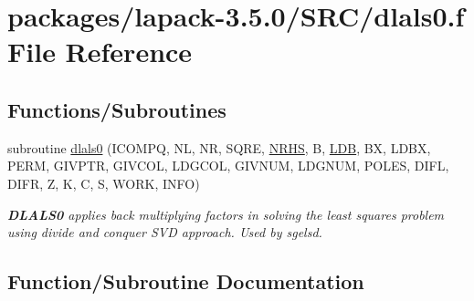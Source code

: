 \hypertarget{dlals0_8f}{}\section{packages/lapack-\/3.5.0/\+S\+R\+C/dlals0.f File Reference}
\label{dlals0_8f}
\subsection*{Functions/\+Subroutines}
\begin{DoxyCompactItemize}
\item 
subroutine \hyperlink{dlals0_8f_a09dd12ecac3ff2bc46fed24422500ab2}{dlals0} (I\+C\+O\+M\+P\+Q, N\+L, N\+R, S\+Q\+R\+E, \hyperlink{example__user_8c_aa0138da002ce2a90360df2f521eb3198}{N\+R\+H\+S}, B, \hyperlink{example__user_8c_a50e90a7104df172b5a89a06c47fcca04}{L\+D\+B}, B\+X, L\+D\+B\+X, P\+E\+R\+M, G\+I\+V\+P\+T\+R, G\+I\+V\+C\+O\+L, L\+D\+G\+C\+O\+L, G\+I\+V\+N\+U\+M, L\+D\+G\+N\+U\+M, P\+O\+L\+E\+S, D\+I\+F\+L, D\+I\+F\+R, Z, K, C, S, W\+O\+R\+K, I\+N\+F\+O)
\begin{DoxyCompactList}\small\item\em {\bfseries D\+L\+A\+L\+S0} applies back multiplying factors in solving the least squares problem using divide and conquer S\+V\+D approach. Used by sgelsd. \end{DoxyCompactList}\end{DoxyCompactItemize}


\subsection{Function/\+Subroutine Documentation}
\hypertarget{dlals0_8f_a09dd12ecac3ff2bc46fed24422500ab2}{}
